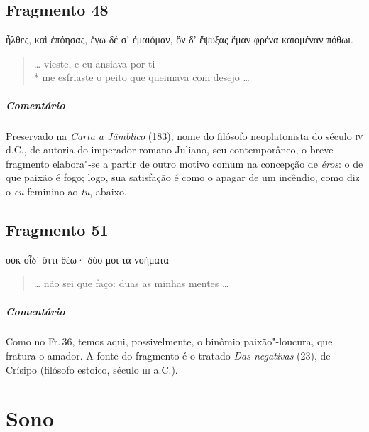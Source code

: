 \section{Fragmento 48}

\begin{gkverse}
ἦλθες, \dagger{}καὶ\dagger{} ἐπόησας, ἔγω δέ σ’ ἐμαιόμαν,
ὂν δ’ ἔψυξας ἔμαν φρένα καιομέναν πόθωι.
\end{gkverse}

\begin{verse}
\ldots{} vieste, e eu ansiava por ti -- \\*
me esfriaste o peito que queimava com desejo \ldots{}
\end{verse}

\medskip

{\paragraph{Comentário} Preservado na \textit{Carta a Jâmblico} (183), nome do filósofo neoplatonista do
século \textsc{iv} d.C., de autoria do imperador romano Juliano, seu contemporâneo, o
breve fragmento elabora"-se a partir de outro motivo comum na concepção de
\textit{éros}: o de que paixão é fogo; logo, sua satisfação é como o apagar de
um incêndio, como diz o \textit{eu} feminino ao \textit{tu}, abaixo.}

\pagebreak
\section{Fragmento 51}

\begin{gkverse}
οὐκ οἶδ’ ὄττι θέω· δύο μοι τὰ νοήματα
\end{gkverse}

\begin{verse}
\ldots{} não sei que faço: duas as minhas mentes \ldots{}
\end{verse}

\medskip

{\paragraph{Comentário} Como no Fr.\,36, temos aqui, possivelmente, o binômio paixão"-loucura, que fratura o amador. A
fonte do fragmento é o tratado \textit{Das negativas} (23), de Crísipo (filósofo
estoico, século \textsc{iii} a.C.).}   


\chapter{Sono}

